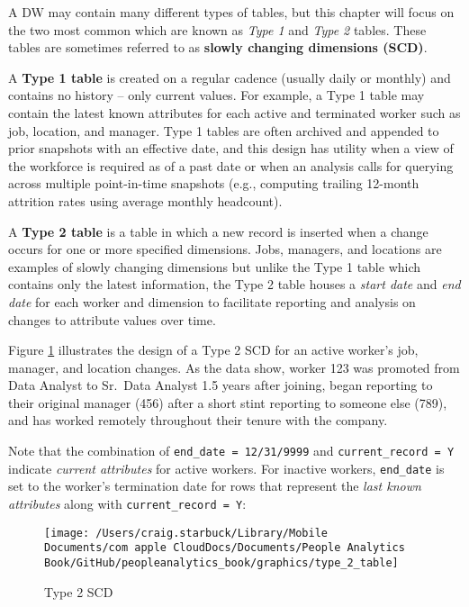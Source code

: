 \documentclass[
]{book}
\begin{document}
A DW may contain many different types of tables, but this chapter will focus on the two most common which are known as \emph{Type 1} and \emph{Type 2} tables. These tables are sometimes referred to as \textbf{slowly changing dimensions (SCD)}.

A \textbf{Type 1 table} is created on a regular cadence (usually daily or monthly) and contains no history -- only current values. For example, a Type 1 table may contain the latest known attributes for each active and terminated worker such as job, location, and manager. Type 1 tables are often archived and appended to prior snapshots with an effective date, and this design has utility when a view of the workforce is required as of a past date or when an analysis calls for querying across multiple point-in-time snapshots (e.g., computing trailing 12-month attrition rates using average monthly headcount).

A \textbf{Type 2 table} is a table in which a new record is inserted when a change occurs for one or more specified dimensions. Jobs, managers, and locations are examples of slowly changing dimensions but unlike the Type 1 table which contains only the latest information, the Type 2 table houses a \emph{start date} and \emph{end date} for each worker and dimension to facilitate reporting and analysis on changes to attribute values over time.

Figure \ref{fig:type-2-tbl} illustrates the design of a Type 2 SCD for an active worker's job, manager, and location changes. As the data show, worker 123 was promoted from Data Analyst to Sr.~Data Analyst 1.5 years after joining, began reporting to their original manager (456) after a short stint reporting to someone else (789), and has worked remotely throughout their tenure with the company.

Note that the combination of \texttt{end\_date\ =\ \textquotesingle{}12/31/9999\textquotesingle{}} and \texttt{current\_record\ =\ \textquotesingle{}Y\textquotesingle{}} indicate \emph{current attributes} for active workers. For inactive workers, \texttt{end\_date} is set to the worker's termination date for rows that represent the \emph{last known attributes} along with \texttt{current\_record\ =\ \textquotesingle{}Y\textquotesingle{}}:

\begin{figure}

{\centering \texttt{[image: /Users/craig.starbuck/Library/Mobile Documents/com~apple~CloudDocs/Documents/People Analytics Book/GitHub/peopleanalytics\_book/graphics/type\_2\_table]} 

}

\caption{Type 2 SCD}\label{fig:type-2-tbl}
\end{figure}
\end{document}
